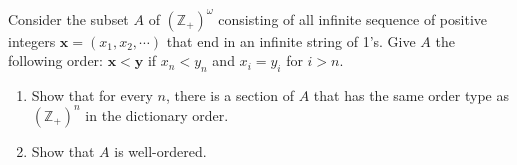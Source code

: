 \documentclass[a4paper,12pt]{article}
\begin{document}
\begin{exe}
	Consider the subset \( A \) of \( (\mathbb{Z}_{+})^{\omega} \)
	consisting of all infinite sequence of positive integers
	\( \bm{x}=(x_1,x_2,\cdots) \)
	that end in an infinite string of 1's.
	Give \( A \) the following order:
	\( \bm{x} < \bm{y} \) if \( x_n < y_n \) and \( x_i=y_i \) for \( i>n \).
	\begin{enumerate}
		\item
		      Show that for every \( n \),
		      there is a section of \( A \) that has the same order type as
		      \( (\mathbb{Z}_{+})^{n} \) in the dictionary order.
		      
		\item
		      Show that \( A \) is well-ordered.
	\end{enumerate}
\end{exe}
\end{document}
